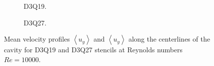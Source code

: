 \begin{figure}[hbt!]
\centering
\begin{subfigure}{0.45\textwidth}
    \centering
    
    \caption{D3Q19.}
    \label{subfig:D3Q19_Re_10000}
\end{subfigure}
\hfill
\begin{subfigure}{0.45\textwidth}
    \centering
    
    \caption{D3Q27.}
    \label{subfig:D3Q27_Re_10000}
\end{subfigure}
\caption{Mean velocity profiles $\left<u_{y}\right>$ and $\left<u_y\right>$ along the centerlines of the cavity for D3Q19 and D3Q27 stencils at Reynolds numbers $Re = \num{10000}$.}
\label{fig:cavityVelocityProfilesCentreline}
\end{figure}%